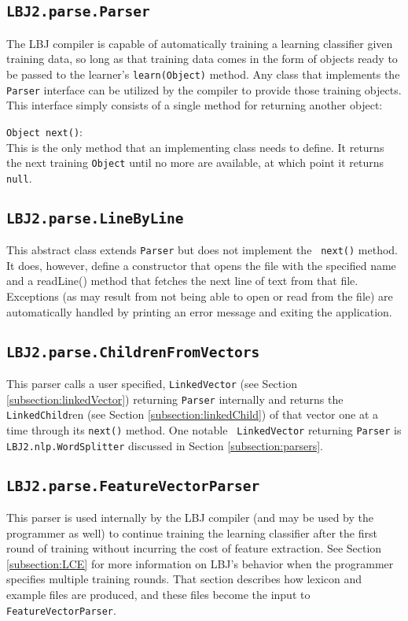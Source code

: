 \subsection{{\tt LBJ2.parse.Parser}} \label{subsection:parser}
The LBJ compiler is capable of automatically training a learning classifier
given training data, so long as that training data comes in the form of
objects ready to be passed to the learner's {\tt learn(Object)} method.  Any
class that implements the {\tt Parser} interface can be utilized by the
compiler to provide those training objects.  This interface simply consists of
a single method for returning another object:

\begin{list}{}{}
\item[{\tt Object next()}:] ~\\
This is the only method that an implementing class needs to define.  It
returns the next training {\tt Object} until no more are available, at which
point it returns {\tt null}.
\end{list}

\subsection{{\tt LBJ2.parse.LineByLine}} \label{subsection:lineByLine}
This abstract class extends {\tt Parser} but does not implement the {\tt
next()} method.  It does, however, define a constructor that opens the file
with the specified name and a readLine() method that fetches the next line of
text from that file.  Exceptions (as may result from not being able to open or
read from the file) are automatically handled by printing an error message and
exiting the application.

\subsection{{\tt LBJ2.parse.ChildrenFromVectors}} \label{subsection:CFV}
This parser calls a user specified, {\tt LinkedVector} (see Section
\ref{subsection:linkedVector}) returning {\tt Parser} internally and returns
the {\tt LinkedChild}ren (see Section \ref{subsection:linkedChild}) of that
vector one at a time through its {\tt next()} method.  One notable {\tt
LinkedVector} returning {\tt Parser} is {\tt LBJ2.nlp.WordSplitter} discussed
in Section \ref{subsection:parsers}.

\subsection{{\tt LBJ2.parse.FeatureVectorParser}} \label{subsection:FVP}
This parser is used internally by the LBJ compiler (and may be used by the
programmer as well) to continue training the learning classifier after the
first round of training without incurring the cost of feature extraction.  See
Section \ref{subsection:LCE} for more information on LBJ's behavior when the
programmer specifies multiple training rounds.  That section describes how
lexicon and example files are produced, and these files become the input to
{\tt FeatureVectorParser}. \\

